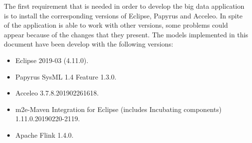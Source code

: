 The first requirement that is needed in order to develop the big data application is to install the corresponding versions of Eclipse, Papyrus and Acceleo. In spite of the application is able to work with other versions, some problems could appear because of the changes that they present. The models implemented in this document have been develop with the following versions:

\begin{itemize}

\item Eclipse 2019-03 (4.11.0).
\item Papyrus SysML 1.4 Feature	1.3.0.
\item Acceleo 3.7.8.201902261618.
\item m2e-Maven Integration for Eclipse (includes Incubating components) 1.11.0.20190220-2119.
\item Apache Flink 1.4.0.

\end{itemize}
